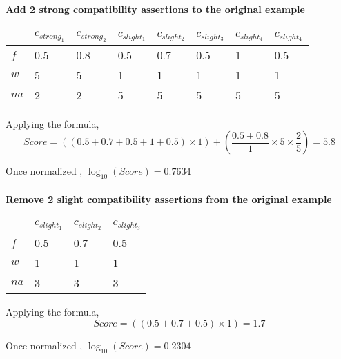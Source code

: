 \documentclass[11pt]{article}
\begin{document}
\begin{large}
\textbf{Add 2 strong compatibility assertions to the original example} \\
\begin{tabular}{|l|l|l|l|l|l|l|l|}
\hline
     & $c_{strong_{1}}$ & $c_{strong_{2}}$ & $c_{slight_{1}}$ & $c_{slight_{2}}$ & $c_{slight_{3}}$ & $c_{slight_{4}}$ & $c_{slight_{4}}$ \\ \hline
$f$  & 0.5              & 0.8              & 0.5              & 0.7              & 0.5              & 1                & 0.5              \\ \hline
$w$  & 5                & 5                & 1                & 1                & 1                & 1                & 1                \\ \hline
$na$ & 2                & 2                & 5                & 5                & 5                & 5                & 5                \\ \hline
\end{tabular}

Applying the formula, \\
$$Score = ((0.5 + 0.7 +0.5 +1 + 0.5) \times 1) + (\frac{0.5+0.8}{1} \times 5 \times \frac{2}{5}) = 5.8 $$

Once normalized , $\log_{10}(Score) =  0.7634$ \\ \\

\textbf{Remove 2 slight compatibility assertions from the original example} \\
\begin{tabular}{|l|l|l|l|}
\hline
     & $c_{slight_{1}}$ & $c_{slight_{2}}$ & $c_{slight_{3}}$ \\ \hline
$f$  & 0.5              & 0.7              & 0.5              \\ \hline
$w$  & 1                & 1                & 1                \\ \hline
$na$ & 3                & 3                & 3                \\ \hline
\end{tabular}

Applying the formula, \\
$$Score = ((0.5 + 0.7 +0.5) \times 1) = 1.7 $$

Once normalized , $\log_{10}(Score) =  0.2304$ \\ \\


\end{large}
\end{document}

